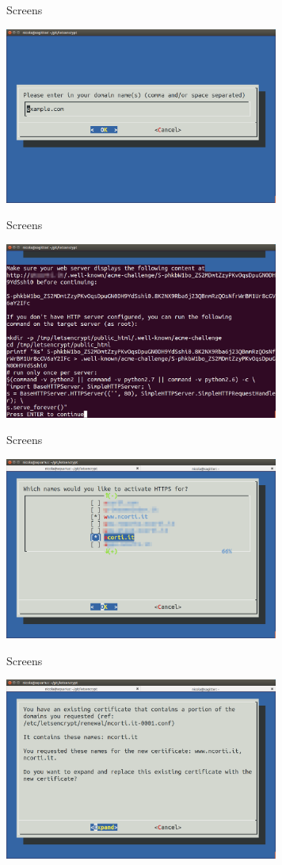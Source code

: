 \documentclass[xcolor=svgnames,11pt]{beamer}
\begin{document}
\begin{frame}{Screens}
\begin{center}
\includegraphics[width=9cm]{img/screen3.png}
\end{center}
\end{frame}
\begin{frame}{Screens}
\begin{center}
\includegraphics[width=9cm]{img/screen4.png}
\end{center}
\end{frame}
\begin{frame}{Screens}
\begin{center}
\includegraphics[width=9cm]{img/screen5.png}
\end{center}
\end{frame}
\begin{frame}{Screens}
\begin{center}
\includegraphics[width=9cm]{img/screen6.png}
\end{center}
\end{frame}
\end{document}
